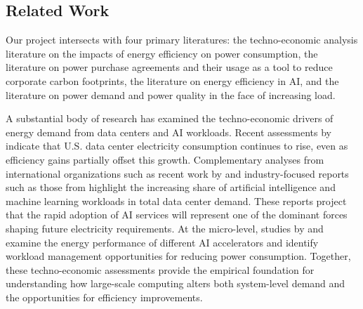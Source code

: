 \subsection{Related Work}
\label{sec:related-work}
Our project intersects with four primary literatures: the techno-economic analysis literature on the impacts of energy efficiency on power consumption, the literature on power purchase agreements and their usage as a tool to reduce corporate carbon footprints, the literature on energy efficiency in AI, and the literature on power demand and power quality in the face of increasing load.

A substantial body of research has examined the techno-economic drivers of energy demand from data centers and AI workloads. Recent assessments by \cite{RN6} indicate that U.S. data center electricity consumption continues to rise, even as efficiency gains partially offset this growth. Complementary analyses from international organizations such as recent work by \cite{RN1} and industry-focused reports such as those from \cite{RN3} highlight the increasing share of artificial intelligence and machine learning workloads in total data center demand. These reports project that the rapid adoption of AI services will represent one of the dominant forces shaping future electricity requirements. At the micro-level, studies by \cite{RN9} and \cite{RN4} examine the energy performance of different AI accelerators and identify workload management opportunities for reducing power consumption. Together, these techno-economic assessments provide the empirical foundation for understanding how large-scale computing alters both system-level demand and the opportunities for efficiency improvements.


